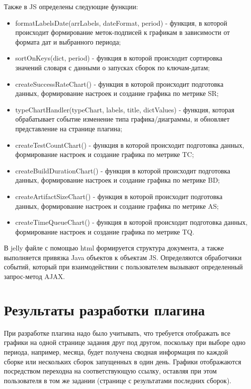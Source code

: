 Также в JS определены следующие функции:

\begin{itemize}
	\item formatLabelsDate(arrLabels, dateFormat, period) - функция, в которой происходит формирование меток-подписей к графикам в зависимости от формата дат и выбранного периода;
	\item sortOnKeys(dict, period) - функция в которой происходит сортировка значений словаря с данными о запусках сборок по ключам-датам;
	\item createSuccessRateChart() - функция в которой происходит подготовка данных, формирование настроек и создание графика по метрике SR;
	\item typeChartHandler(typeChart, labels, title, dictValues) - функция, которая обрабатывает событие изменение типа графика/диаграммы, и обновляет представление на странице плагина;
	\item createTestCountChart() - функция в которой происходит подготовка данных, формирование настроек и создание графика по метрике TC;
	\item createBuildDurationChart() - функция в которой происходит подготовка данных, формирование настроек и создание графика по метрике BD;
	\item createArtifactSizeChart() - функция в которой происходит подготовка данных, формирование настроек и создание графика по метрике AS;
	\item createTimeQueueChart() - функция в которой происходит подготовка данных, формирование настроек и создание графика по метрике TQ.
\end{itemize}

В jelly файле с помощью html формируется структура документа, а также выполняется привязка Java объектов к объектам JS. Определяются обработчики событий, который при взаимодействии с пользователем вызывают определенный запрос-метод AJAX.

\section{Результаты разработки плагина} \label{ch3:sec2}

При разработке плагина надо было учитывать, что требуется отображать все графики на одной странице задания друг под другом, поскольку при выборе одно периода, например, месяца, будет получена сводная информация по каждой сборке или нескольких сборок запущенных в один день. Графики отображаются посредством переходна на соответствующую ссылку, оставляя при этом пользователя в том же задании (странице с результатами последних сборок).


